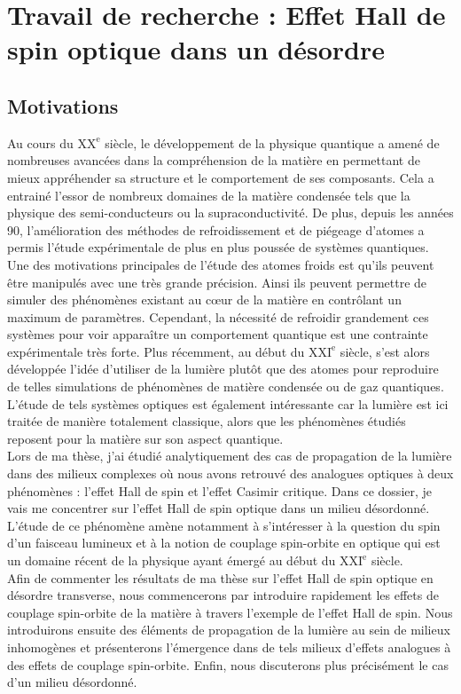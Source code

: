 \documentclass[a4paper,11pt]{article} %
\begin{document}
	
	\section{Travail de recherche : Effet Hall de spin optique dans un désordre}
	\subsection{Motivations}
	Au cours du $ \text{XX}^\text{e} $ siècle, le développement de la physique quantique a amené de nombreuses avancées dans la compréhension de la matière en permettant de mieux appréhender sa structure et le comportement de ses composants. Cela a entrainé l'essor de nombreux domaines de la matière condensée tels que la physique des semi-conducteurs ou la supraconductivité. De plus, depuis les années 90, l'amélioration des méthodes de refroidissement et de piégeage d'atomes a permis l'étude expérimentale de plus en plus poussée de systèmes quantiques. Une des motivations principales de l'étude des atomes froids est qu'ils peuvent être manipulés avec une très grande précision. Ainsi ils peuvent permettre de simuler des phénomènes existant au c\oe ur de la matière en contrôlant un maximum de paramètres. Cependant, la nécessité de refroidir grandement ces systèmes pour voir apparaître un comportement quantique est une contrainte expérimentale très forte. Plus récemment, au début du $ \text{XXI}^\text{e} $ siècle, s'est alors développée l'idée d'utiliser de la lumière plutôt que des atomes pour reproduire de telles simulations de phénomènes de matière condensée ou de gaz quantiques. L'étude de tels systèmes optiques est également intéressante car la lumière est ici traitée de manière totalement classique, alors que les phénomènes étudiés reposent pour la matière sur son aspect quantique.\\
	
	Lors de ma thèse, j'ai étudié analytiquement des cas de propagation de la lumière dans des milieux complexes où nous avons retrouvé des analogues optiques à deux phénomènes : l'effet Hall de spin et l'effet Casimir critique. Dans ce dossier, je vais me concentrer sur l'effet Hall de spin optique dans un milieu désordonné. L'étude de ce phénomène amène notamment à s'intéresser à la question du spin d'un faisceau lumineux et à la notion de couplage spin-orbite en optique qui est un domaine récent de la physique ayant émergé au début du $ \text{XXI}^\text{e} $ siècle.\\
	
	Afin de commenter les résultats de ma thèse sur l'effet Hall de spin optique en désordre transverse, nous commencerons par introduire rapidement les effets de couplage spin-orbite de la matière à travers l'exemple de l'effet Hall de spin. Nous introduirons ensuite des éléments de propagation de la lumière au sein de milieux inhomogènes et présenterons l'émergence dans de tels milieux d'effets analogues à des effets de couplage spin-orbite. Enfin, nous discuterons plus précisément le cas d'un milieu désordonné.
	
\end{document}
